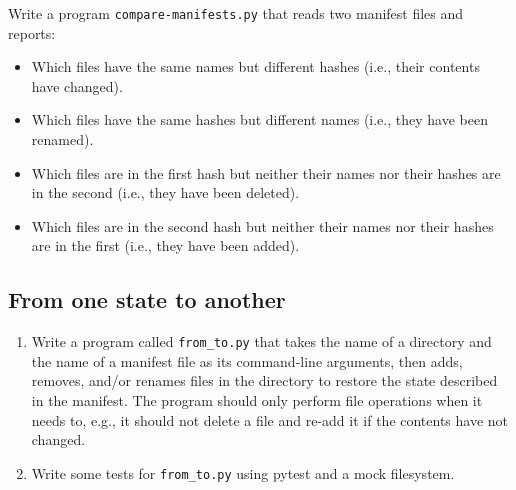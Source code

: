 \documentclass{scrbook}
\begin{document}
Write a program \texttt{compare-manifests.py} that reads two manifest files and reports:

\begin{itemize}

\item 

Which files have the same names but different hashes
    (i.e., their contents have changed).



\item 

Which files have the same hashes but different names
    (i.e., they have been renamed).



\item 

Which files are in the first hash but neither their names nor their hashes are in the second
    (i.e., they have been deleted).



\item 

Which files are in the second hash but neither their names nor their hashes are in the first
    (i.e., they have been added).



\end{itemize}

\subsection*{From one state to another}

\begin{enumerate}

\item 

Write a program called \texttt{from\_to.py} that takes the name of a directory
    and the name of a manifest file
    as its command-line arguments,
    then adds, removes, and/or renames files in the directory
    to restore the state described in the manifest.
    The program should only perform file operations when it needs to,
    e.g.,
    it should not delete a file and re-add it if the contents have not changed.



\item 

Write some tests for \texttt{from\_to.py} using pytest and a mock filesystem.



\end{enumerate}
\end{document}
